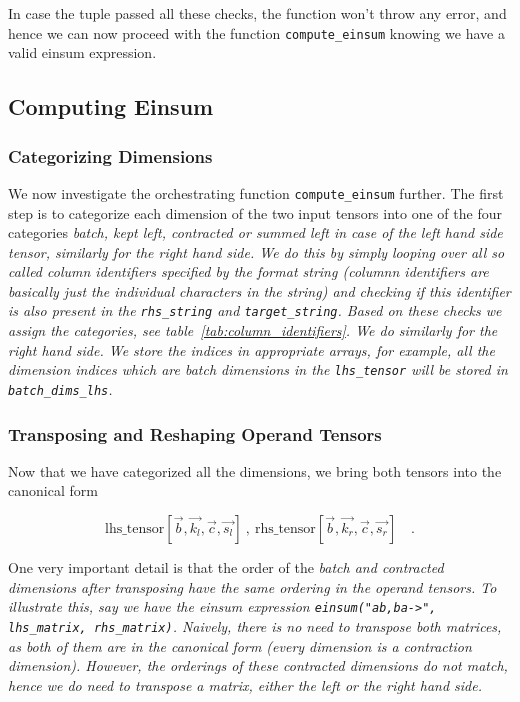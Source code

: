 \documentclass[sigconf]{acmart}
\begin{document}
In case the tuple passed all these checks, the function won't throw any error, and hence we can now proceed with the function \texttt{compute\_einsum} knowing we have a valid einsum expression.


\subsection{Computing Einsum}
\subsubsection{Categorizing Dimensions}
We now investigate the orchestrating function \texttt{compute\_einsum} further.
The first step is to categorize each dimension of the two input tensors into one of the four categories \em batch, kept left, contracted \em or \em summed left \em in case of the left hand side tensor, similarly for the right hand side. We do this by simply looping over all so called \em column identifiers \em specified by the format string (columnn identifiers are basically just the individual characters in the string) and checking if this identifier is also present in the \texttt{rhs\_string} and \texttt{target\_string}. Based on these checks we assign the categories, see table~\ref{tab:column_identifiers}. We do similarly for the right hand side. We store the indices in appropriate arrays, for example, all the dimension indices which are batch dimensions in the \texttt{lhs\_tensor} will be stored in \texttt{batch\_dims\_lhs}.

\subsubsection{Transposing and Reshaping Operand Tensors}
Now that we have categorized all the dimensions, we bring both tensors into the canonical form

\[ \text{lhs\_tensor}[\vec{b}, \vec{k_l}, \vec{c}, \vec{s_l}] \ , \ \text{rhs\_tensor}[\vec{b}, \vec{k_r}, \vec{c}, \vec{s_r}] \quad . \]

One very important detail is that the order of the \em batch \em and \em contracted \em dimensions after transposing have the same ordering in the operand tensors. To illustrate this, say we have the einsum expression \texttt{einsum("ab,ba->", lhs\_matrix, rhs\_matrix)}. Naively, there is no need to transpose both matrices, as both of them are in the canonical form (every dimension is a contraction dimension). However, the orderings of these contracted dimensions do not match, hence we do need to transpose a matrix, either the left or the right hand side.
\end{document}
